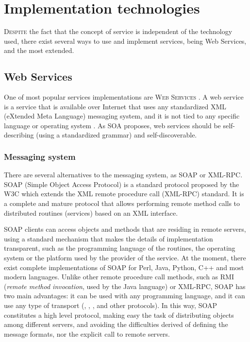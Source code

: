 \section{Implementation technologies}

\lettrine{D}{espite} the fact that the concept of service is independent of the technology used, there exist several ways to use and implement services, being Web Services,  and  the most extended.

\subsection{Web Services}

One of most popular services implementations are  \textsc{Web
  Services} \cite{Papazoglou2007SOA}. A web service is a service that
is available over Internet that uses any standardized XML (eXtended
Meta Language) \cite{XML} messaging system, and it is not tied to any
specific language or operating system \cite{Cerami2002Webservices}.
As SOA proposes, web services should be self-describing (using a
standardized grammar) and self-discoverable. %

\subsubsection{Messaging system} There are several alternatives to the messaging system, as SOAP or XML-RPC. SOAP (Simple Object Access Protocol) is a standard protocol proposed by the W3C \cite{SOAP}  which  extends the XML remote procedure call (XML-RPC) standard. 
It is a complete and mature protocol that allows performing remote
method calls to distributed routines (services) based on an XML
interface. %

SOAP clients can access objects and methods that are residing in
remote servers, using a standard mechanism that makes  the details of
implementation transparent, such as the programming language of the
routines, the operating system or the platform used by the provider of
the service. %
At the moment, there exist complete implementations of SOAP for Perl, Java, Python, C++ and most modern languages.
Unlike other remote procedure call methods, such as RMI (\emph{remote method invocation}, used by the Java language) or XML-RPC, SOAP has two main advantages: it can be used with any programming language, and it can use any type of transport (, , ,  and other protocols). In this way, SOAP constitutes a high level protocol, making easy the task of distributing objects among different servers, and avoiding the difficulties derived of defining the message formats, nor the explicit call to remote servers.


